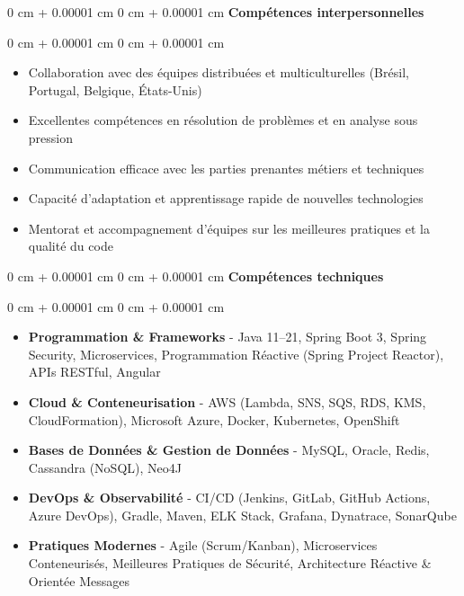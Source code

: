\documentclass[10pt, letterpaper]{article}
\newenvironment{highlights}{
    \begin{itemize}[
        topsep=0.10 cm,
        parsep=0.10 cm,
        partopsep=0pt,
        itemsep=0pt,
        leftmargin=0 cm + 10pt
    ]
}{
    \end{itemize}
} %
\newenvironment{onecolentry}{
    \begin{adjustwidth}{
        0 cm + 0.00001 cm
    }{
        0 cm + 0.00001 cm
    }
}{
    \end{adjustwidth}
} %
\begin{document}
        \begin{onecolentry} \textbf{Compétences interpersonnelles}\end{onecolentry}

        \vspace{0.10 cm}

        \begin{onecolentry}
            \begin{highlights}
                \item Collaboration avec des équipes distribuées et multiculturelles (Brésil, Portugal, Belgique, États-Unis)
                \item Excellentes compétences en résolution de problèmes et en analyse sous pression
                \item Communication efficace avec les parties prenantes métiers et techniques
                \item Capacité d'adaptation et apprentissage rapide de nouvelles technologies
                \item Mentorat et accompagnement d'équipes sur les meilleures pratiques et la qualité du code
            \end{highlights}
        \end{onecolentry}

        \vspace{0.2 cm}

        \begin{onecolentry} \textbf{Compétences techniques}\end{onecolentry}

        \vspace{0.10 cm}

        \begin{onecolentry}
            \begin{highlights}
                \item \textbf{Programmation \& Frameworks} - Java 11–21, Spring Boot 3, Spring Security, Microservices, Programmation Réactive (Spring Project Reactor), APIs RESTful, Angular
                \item \textbf{Cloud \& Conteneurisation} - AWS (Lambda, SNS, SQS, RDS, KMS, CloudFormation), Microsoft Azure, Docker, Kubernetes, OpenShift
                \item \textbf{Bases de Données \& Gestion de Données} - MySQL, Oracle, Redis, Cassandra (NoSQL), Neo4J
                \item \textbf{DevOps \& Observabilité} - CI/CD (Jenkins, GitLab, GitHub Actions, Azure DevOps), Gradle, Maven, ELK Stack, Grafana, Dynatrace, SonarQube
                \item \textbf{Pratiques Modernes} - Agile (Scrum/Kanban), Microservices Conteneurisés, Meilleures Pratiques de Sécurité, Architecture Réactive \& Orientée Messages
            \end{highlights}
        \end{onecolentry}
\end{document}
